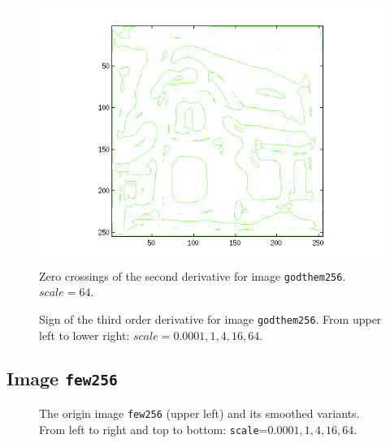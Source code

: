 \begin{figure}[H]
	\centering
	\includegraphics[scale=0.8]{./images/Q4/vv/64.png}
	\caption{Zero crossings of the second derivative for image \texttt{godthem256}. $scale = 64$.}
	\label{fig:Q4_vv_64}
\end{figure}


\begin{figure}[H]
	\centering
	\scalebox{0.8}{}
	\caption{Sign of the third order derivative for image \texttt{godthem256}. From upper left to lower right: $scale = 0.0001, 1, 4, 16, 64$.}
	\label{fig:Q4_vvv_}
\end{figure}


\subsection{Image \texttt{few256}}

\begin{figure}[H]
	\centering
  \scalebox{0.8}{}
  \caption{The origin image \texttt{few256} (upper left) and its smoothed variants.
    From left to right and top to bottom: \texttt{scale}=$0.0001, 1, 4, 16, 64$.}
	\label{fig:Q5_smoothed_few256}
\end{figure}


